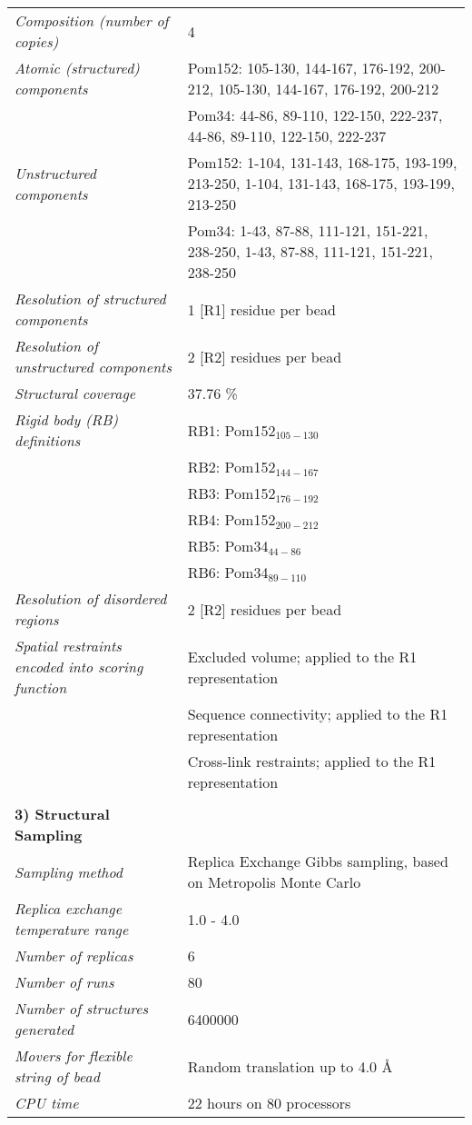 \documentclass[11pt,a4paper]{article}
\begin{document}
\begin{landscape}
\begin{longtable}{ p{} | p{} }
            \textit{Composition (number of copies)} & 4\\
                \textit{Atomic (structured) components} & Pom152: 105-130, 144-167, 176-192, 200-212, 105-130, 144-167, 176-192, 200-212\\
            & Pom34: 44-86, 89-110, 122-150, 222-237, 44-86, 89-110, 122-150, 222-237 \\
                \textit{Unstructured components} & Pom152: 1-104, 131-143, 168-175, 193-199, 213-250, 1-104, 131-143, 168-175, 193-199, 213-250\\
            & Pom34: 1-43, 87-88, 111-121, 151-221, 238-250, 1-43, 87-88, 111-121, 151-221, 238-250 \\
                \textit{Resolution of structured components} & 1 [R1] residue per bead\\
                \textit{Resolution of unstructured components} & 2 [R2] residues per bead\\
                \textit{Structural coverage} & 37.76 \%\\
                \textit{Rigid body (RB) definitions} & RB1: Pom152$_{105-130}$\\
            & RB2: Pom152$_{144-167}$ \\
            & RB3: Pom152$_{176-192}$ \\
            & RB4: Pom152$_{200-212}$ \\
            & RB5: Pom34$_{44-86}$ \\
            & RB6: Pom34$_{89-110}$ \\
                \textit{Resolution of disordered regions} & 2 [R2] residues per bead\\
                \textit{Spatial restraints encoded into scoring function} & Excluded volume; applied to the R1 representation\\
            & Sequence connectivity; applied to the R1 representation \\
            & Cross-link restraints; applied to the R1 representation \\
          
   &  \\
    \normalsize{\textbf{3) Structural Sampling}} & \\
    \hline
            \textit{Sampling method} & Replica Exchange Gibbs sampling, based on Metropolis Monte Carlo\\
                \textit{Replica exchange temperature range} & 1.0 - 4.0\\
                \textit{Number of replicas} & 6\\
                \textit{Number of runs} & 80\\
                \textit{Number of structures generated} & 6400000\\
                \textit{Movers for flexible string of bead} & Random translation up to 4.0 \AA\\
                \textit{CPU time} & 22 hours on 80 processors\\
        

\end{longtable}
\end{landscape}
\end{document}
